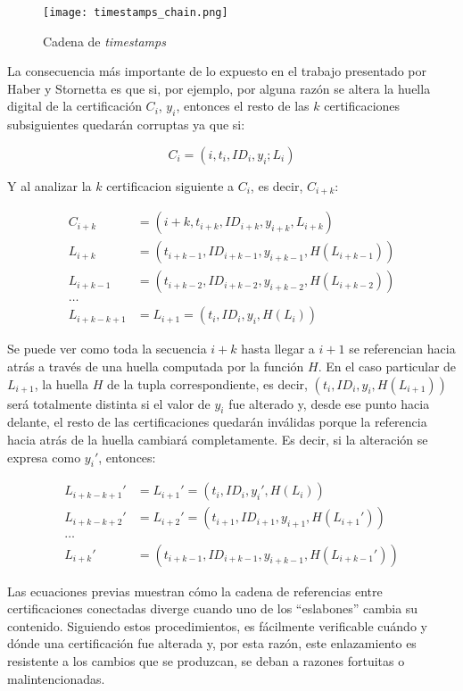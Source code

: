 \begin{figure}[H]
  \texttt{[image: timestamps\_chain.png]}
  \centering
  \caption{Cadena de \textit{timestamps}  }
  \label{fig:timestamps-chain}
\end{figure}

La consecuencia más importante de lo expuesto en el trabajo presentado por Haber y Stornetta es que si, por ejemplo, por alguna razón se altera la huella digital de la certificación $C_i$, $y_i$, entonces el resto de las $k$ certificaciones subsiguientes quedarán corruptas ya que si:

\begin{equation}
  C_i = (i, t_i, ID_i, y_i; L_i)
\end{equation}

Y al analizar la $k$ certificacion siguiente a $C_i$, es decir, $C_{i+k}$:

\begin{align}
  C_{i+k}     &= (i+k, t_{i+k}, ID_{i+k}, y_{i+k}, L_{i+k})\\
  L_{i+k}     &= (t_{i+k-1}, ID_{i+k-1}, y_{i+k-1}, H(L_{i+k-1}))\\
  L_{i+k-1}   &= (t_{i+k-2}, ID_{i+k-2}, y_{i+k-2}, H(L_{i+k-2}))\\
  \dots\\
  L_{i+k-k+1} &= L_{i+1} = (t_i, ID_i, y_i, H(L_i))
\end{align}

Se puede ver como toda la secuencia $i+k$ hasta llegar a $i+1$ se referencian hacia atrás a través de una huella computada por la función $H$. En el caso particular de $L_{i+1}$, la huella $H$ de la tupla correspondiente, es decir, $(t_i, ID_i, y_i, H(L_{i+1}))$ será totalmente distinta si el valor de $y_i$ fue alterado y, desde ese punto hacia delante, el resto de las certificaciones quedarán inválidas porque la referencia hacia atrás de la huella cambiará completamente. Es decir, si la alteración se expresa como $y_i'$, entonces:

\begin{align}
  L_{i+k-k+1}' &= L_{i+1}' = (t_i, ID_i, y_i', H(L_i))\\
  L_{i+k-k+2}' &= L_{i+2}' = (t_{i+1}, ID_{i+1}, y_{i+1}, H(L_{i+1}'))\\
  \dots\\
  L_{i+k}'     &= (t_{i+k-1}, ID_{i+k-1}, y_{i+k-1}, H(L_{i+k-1}'))
\end{align}

Las ecuaciones previas muestran cómo la cadena de referencias entre certificaciones conectadas diverge cuando uno de los ``eslabones'' cambia su contenido. Siguiendo estos procedimientos, es fácilmente verificable cuándo y dónde una certificación fue alterada y, por esta razón, este enlazamiento es resistente a los cambios que se produzcan, se deban a razones fortuitas o malintencionadas.

